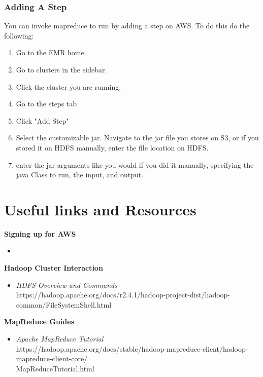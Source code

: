 \documentclass{article}
\begin{document}
\subsubsection{Adding A Step}
You can invoke mapreduce to run by adding a step on AWS. To do this do the following:
\begin{enumerate}
    \item Go to the EMR home.
    \item Go to clusters in the sidebar. 
    \item Click the cluster you are running. 
    \item Go to the steps tab
    \item Click "Add Step"
    \item Select the customizable jar. Navigate to the jar file you stores on S3, or if you stored it on HDFS manually, enter the file location on HDFS.
    \item enter the jar arguments like you would if you did it manually, specifying the java Class to run, the input, and output.
\end{enumerate}

\section{Useful links and Resources}
\textbf{Signing up for AWS}
\begin{itemize}
    \item 
\end{itemize}
\textbf{Hadoop Cluster Interaction}
\begin{itemize}
    \item \textit{HDFS Overview and Commands}\\ https://hadoop.apache.org/docs/r2.4.1/hadoop-project-dist/hadoop-common/FileSystemShell.html
\end{itemize}
\textbf{MapReduce Guides}
\begin{itemize}
    \item \textit{Apache MapReduce Tutorial}\\ https://hadoop.apache.org/docs/stable/hadoop-mapreduce-client/hadoop-mapreduce-client-core/\\MapReduceTutorial.html
\end{itemize} 
\end{document}
